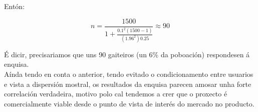 Entón:

\begin{equation}
 n = \frac{1500}{1 + \frac{0.1^2(1500-1)}{(1.96^2)0.25}} \approx 90
\end{equation}

É dicir, precisariamos que uns 90 gaiteiros (un 6\% da poboación) respondesen á
enquisa. \\

Aínda tendo en conta o anterior, tendo evitado o condicionamento entre usuarios
e vista a dispersión mostral, os resultados da enquisa parecen amosar unha
forte correlación verdadeira, motivo polo cal tendemos a crer que o proxecto é
comercialmente viable desde o punto de vista de interés do mercado no producto.

